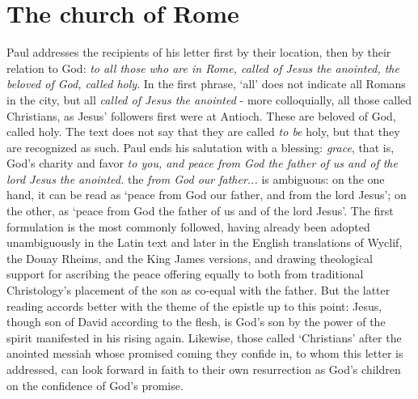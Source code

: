 \section{The church of Rome}
Paul addresses the recipients of his letter first by their location, then by their relation to God: \emph{to all those who are in Rome, called of Jesus the anointed, the beloved of God, called holy}. In the first phrase, `all' does not indicate all Romans in the city, but all \emph{called of Jesus the anointed} - more colloquially, all those called Christians, as Jesus' followers first were at Antioch. These are beloved of God, called holy. The text does not say that they are called \emph{to be} holy, but that they are recognized as such. Paul ends his salutation with a blessing: \emph{grace}, that is, God's charity and favor \emph{to you, and peace from God the father of us and of the lord Jesus the anointed.} the \emph{from God our father...} is ambiguous: on the one hand, it can be read as `peace from God our father, and from the lord Jesus'; on the other, as `peace from God the father of us and of the lord Jesus'. The first formulation is the most commonly followed, having already been adopted unambiguously in the Latin text and later in the English translations of Wyclif, the Douay Rheims, and the King James versions, and drawing theological support for ascribing the peace offering equally to both from traditional Christology's placement of the son as co-equal with the father. But the latter reading accords better with the theme of the epistle up to this point: Jesus, though son of David according to the flesh, is God's son by the power of the spirit manifested in his rising again. Likewise, those called `Christians' after the anointed messiah whose promised coming they confide in, to whom this letter is addressed, can look forward in faith to their own resurrection as God's children on the confidence of God's promise.